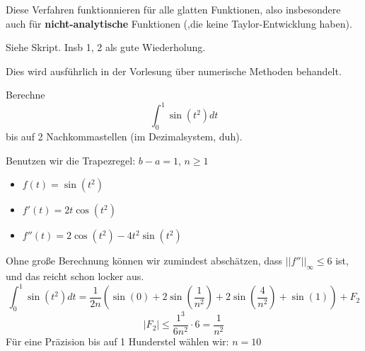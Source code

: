 \documentclass[main.tex]{subfiles}
\begin{document}
\begin{Bemerkung}
  Diese Verfahren funktionnieren für alle glatten Funktionen, also insbesondere auch für \textbf{nicht-analytische} Funktionen (,die keine Taylor-Entwicklung haben).
\end{Bemerkung}

\begin{Beweis}
  Siehe Skript.
  Insb 1, 2 als gute Wiederholung.

  Dies wird ausführlich in der Vorlesung über numerische Methoden behandelt.
\end{Beweis}

\begin{Beispiel}
  Berechne
  $$\int_0^1 \sin(t^2)dt$$
  bis auf 2 Nachkommastellen (im Dezimalsystem, duh).

  Benutzen wir die Trapezregel: $b-a = 1$, $n \geq 1$
  \begin{itemize}
    \item $f(t) = \sin(t^2)$
    \item $f'(t) = 2t \cos (t^2)$
    \item $f''(t) = 2 \cos(t^2) - 4t^2 \sin(t^2)$
  \end{itemize}
  Ohne große Berechnung können wir zumindest abschätzen, dass $||f''||_\infty \leq 6$ ist, und das reicht schon locker aus.
    $$\int_0^1 \sin(t^2)dt = \dfrac{1}{2n} \left( \sin(0) + 2\sin\left(\dfrac{1}{n^2}\right) + 2\sin\left(\dfrac{4}{n^2}\right) + \sin(1) \right) + F_2$$
    $$|F_2| \leq \dfrac{1^3}{6n^2} \cdot 6 = \dfrac{1}{n^2}$$
    Für eine Präzision bis auf 1 Hunderstel wählen wir: $n = 10$
\end{Beispiel}
\end{document}
